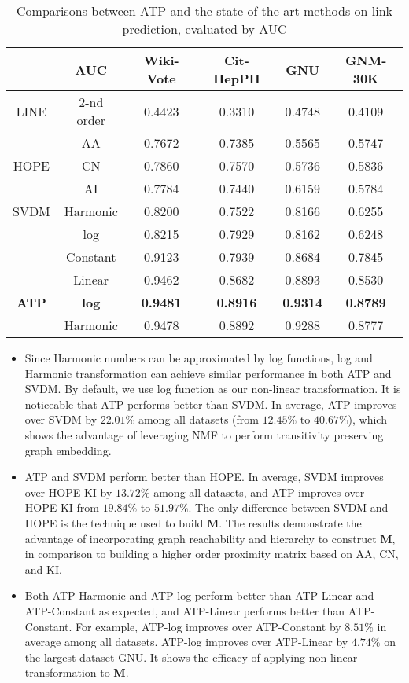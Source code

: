 \documentclass[letterpaper]{article} \usepackage{aaai19}  \usepackage{times}  \usepackage{helvet}  \usepackage{courier}  \usepackage{url}  \usepackage{graphicx}  \usepackage{booktabs} \usepackage{xcolor}
\begin{document}
\begin{table}
\centering
\small
\caption{Comparisons between ATP and the state-of-the-art methods on link prediction, evaluated by AUC}
\setlength\tabcolsep{2.75pt} \begin{tabular}{@{}c|c|cccc@{}} \toprule
 & AUC & Wiki-Vote & Cit-HepPH & GNU &  GNM-30K\\ \midrule
LINE & 2-nd order & 0.4423 & 0.3310 & 0.4748 &  0.4109 \\ \midrule
  & AA & 0.7672 & 0.7385 & 0.5565 & 0.5747\\
 HOPE & CN & 0.7860 & 0.7570 & 0.5736 & 0.5836\\
 & AI & 0.7784 & 0.7440 & 0.6159 &  0.5784\\ \midrule 
SVDM & Harmonic  & 0.8200 & 0.7522 & 0.8166  & 0.6255\\ 
    & log       &  0.8215	& 0.7929	& 0.8162	& 0.6248 \\ \midrule 
& Constant & 0.9123 & 0.7939 & 0.8684 &  0.7845\\
 & Linear & 0.9462 & 0.8682 & 0.8893 &  0.8530\\
 {\bf ATP} &{\bf log} & {\bf 0.9481} & {\bf 0.8916} & {\bf 0.9314}  & {\bf 0.8789}\\ 
& Harmonic & 0.9478 & 0.8892 & 0.9288  & 0.8777\\
 \bottomrule
\end{tabular}
\label{tab:hge_hope_comparison}
\end{table}

\begin{itemize}[leftmargin=0.4cm,noitemsep]
    \item Since Harmonic numbers can be approximated by log functions, log and Harmonic transformation can achieve similar performance in both ATP and SVDM. By default, we use log function as our non-linear transformation. It is noticeable that ATP performs better than SVDM. In average, ATP improves over SVDM by $22.01\%$ among all datasets (from $12.45\%$ to $40.67\%$), which shows the advantage of leveraging NMF to perform transitivity preserving graph embedding. 
    
    \item ATP and SVDM perform better than HOPE. In average, SVDM improves over HOPE-KI by $13.72\%$ among all datasets, and ATP improves over HOPE-KI from $19.84\%$ to $51.97\%$. The only difference between SVDM and HOPE is the technique used to build $\boldsymbol{M}$. The results demonstrate the advantage of incorporating graph reachability and hierarchy to construct $\boldsymbol{M}$, in comparison to building a higher order proximity matrix based on AA, CN, and KI.
    
    \item Both ATP-Harmonic and ATP-log perform better than ATP-Linear and ATP-Constant as expected, and ATP-Linear performs better than ATP-Constant. For example, ATP-log improves over ATP-Constant by $8.51\%$ in average among all datasets. ATP-log improves over ATP-Linear by $4.74\%$ on the largest dataset GNU. It shows the efficacy of applying non-linear transformation to $\boldsymbol{M}$.

    
\end{itemize}
\end{document}
